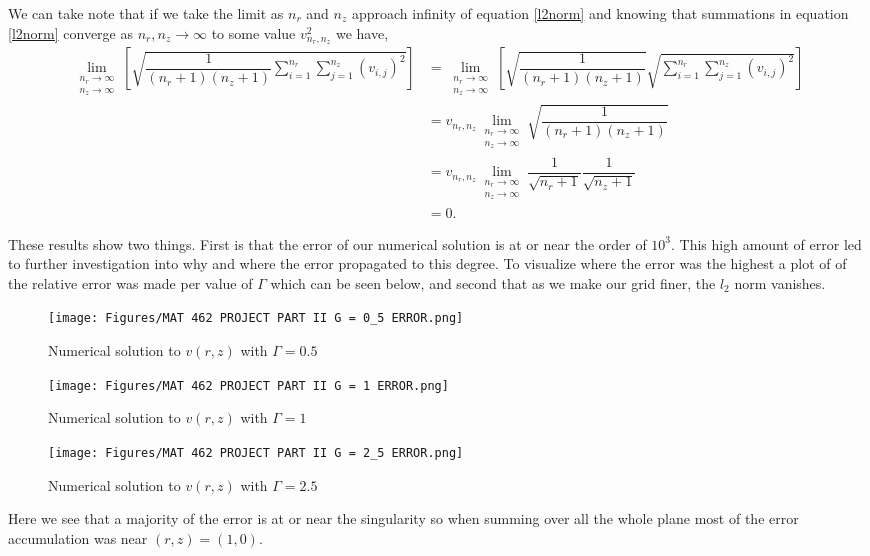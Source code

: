 \documentclass[11pt,letterpaper]{article}
\newcommand{\fpar}[1]{\left({#1}\right)} %
\newcommand{\fbrac}[1]{\left[{#1}\right]} %
\begin{document}
We can take note that if we take the limit as $n_r$ and $n_z$ approach infinity of equation \eqref{l2norm} and knowing that summations in equation \eqref{l2norm} converge as $n_r,n_z \to \infty$ to some value $v^2_{n_r,n_z}$ we have,
\begin{align*}
    \lim_{\substack{n_r \to\infty \\ n_z \to \infty}}\fbrac{\sqrt{\dfrac{1}{(n_r+1)(n_z+1)} \sum_{i = 1}^{n_r}\sum_{j = 1}^{n_z}\fpar{v_{i,j}}^2}} &=    \lim_{\substack{n_r \to\infty \\ n_z \to \infty}}\fbrac{\sqrt{\dfrac{1}{(n_r+1)(n_z+1)}}\sqrt{ \sum_{i = 1}^{n_r}\sum_{j = 1}^{n_z}\fpar{v_{i,j}}^2}}\\
    &= v_{n_r,n_z}\lim_{\substack{n_r \to\infty \\ n_z \to \infty}}{\sqrt{\dfrac{1}{(n_r+1)(n_z+1)}}}\\
    &= v_{n_r,n_z}\lim_{\substack{n_r \to\infty \\ n_z \to \infty}} \dfrac{1}{\sqrt{n_r+1}}\dfrac{1}{\sqrt{n_z+1}}\\
    &= 0.
\end{align*}

These results show two things. First is that the error of our numerical solution is at or near the order of $10^{3}$. This high amount of error led to further investigation into why and where the error propagated to this degree. To visualize where the error was the highest a plot of of the relative error was made per value of $\Gamma$ which can be seen below, and second that as we make our grid finer, the $l_2$ norm vanishes.
\begin{figure}[H]
  \texttt{[image: Figures/MAT 462 PROJECT PART II G = 0\_5 ERROR.png]}
  \caption{Numerical solution to $v(r,z)$ with $\Gamma = 0.5 $}\label{fig:Gamma0.5err}
\endminipage\hfill
{}
  \texttt{[image: Figures/MAT 462 PROJECT PART II G = 1 ERROR.png]}
  \caption{Numerical solution to $v(r,z)$ with $\Gamma = 1 $}\label{fig:Gamma1err}
\endminipage\hfill
{}%
  \texttt{[image: Figures/MAT 462 PROJECT PART II G = 2\_5 ERROR.png]}
  \caption{Numerical solution to  $v(r,z)$ with $\Gamma = 2.5 $}\label{fig:Gamma2.5err}
\endminipage
\end{figure}
Here we see that a majority of the error is at or near the singularity so when summing over all the whole plane most of the error accumulation was near $(r,z)=(1,0)$.
\end{document}
